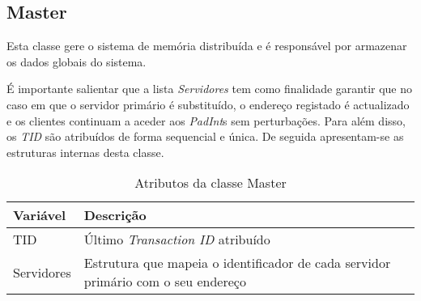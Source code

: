 \subsection{Master}

Esta classe gere o sistema de memória distribuída e é responsável por armazenar os dados globais do sistema.

É importante salientar que a lista \textit{Servidores} tem como finalidade garantir que no caso em que o servidor primário é substituído, o endereço registado é actualizado e os clientes continuam a aceder aos \textit{PadInt}s sem perturbações. Para além disso, os \textit{TID} são atribuídos de forma sequencial e única. De seguida apresentam-se as estruturas internas desta classe.
\begin{table}[H]
\centering
\begin{tabular}{| p{2cm} | p{5cm} |}
\hline
\textbf{Variável} & \textbf{Descrição} \\
\hline
TID & Último \textit{Transaction ID} atribuído \\
\hline
Servidores & Estrutura que mapeia o identificador de cada servidor primário com o seu endereço \\
\hline
\end{tabular}
\caption{Atributos da classe Master}
\end{table}
